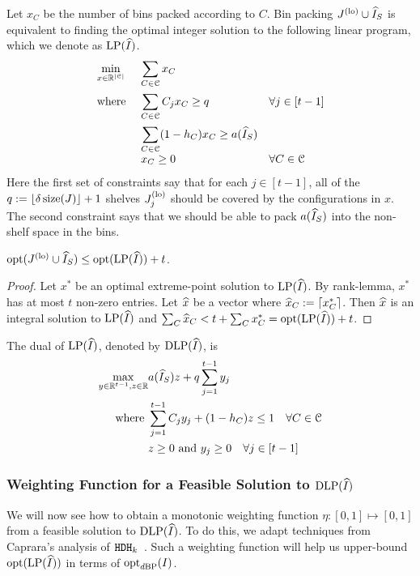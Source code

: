 Let $x_C$ be the number of bins packed according to \config{} $C$.
Bin packing $J^{\mathrm{(lo)}} \cup \widehat{I}_S$ is equivalent to finding the optimal integer solution
to the following linear program, which we denote as $\operatorname{LP}(\widehat{I})$.
\[ \begin{array}{*3{>{\displaystyle}l}}
\min_{x \in \mathbb{R}^{|\Ccal|}} & \sum_{C \in \Ccal} x_C
\\[1.5em] \textrm{where }
    & \sum_{C \in \Ccal} C_j x_C \ge q & \forall j \in [t-1]
\\[1.5em] & \sum_{C \in \Ccal} (1-h_C)x_C \ge a(\Ihat_S)
\\[1em] & x_C \ge 0 & \forall C \in \Ccal
\end{array} \]
Here the first set of constraints say that for each $j \in [t-1]$,
all of the $q := \left\lfloor \delta\operatorname{size}(J) \right\rfloor+1$ shelves $J^{\mathrm{(lo)}}_j$
should be covered by the configurations in $x$.
The second constraint says that we should be able to pack $a(\widehat{I}_S)$
into the non-shelf space in the bins.
\begin{lemma}
\label{thm:hgap:opt-to-lp}
$\operatorname{opt}(J^{\mathrm{(lo)}} \cup \widehat{I}_S) \le \operatorname{opt}(\operatorname{LP}(\widehat{I})) + t$.
\end{lemma}
\begin{proof}
Let $x^*$ be an optimal extreme-point solution to $\operatorname{LP}(\widehat{I})$.
By rank-lemma, $x^*$ has at most $t$ non-zero entries.
Let $\widehat{x}$ be a vector where $\widehat{x}_C := \left\lceil x_C^* \right\rceil$.
Then $\widehat{x}$ is an integral solution to $\operatorname{LP}(\widehat{I})$ and
$\sum_C \widehat{x}_C < t + \sum_C x_C^* = \operatorname{opt}(\operatorname{LP}(\widehat{I})) + t$.
\end{proof}
%
The dual of $\operatorname{LP}(\widehat{I})$, denoted by $\operatorname{DLP}(\widehat{I})$, is
\begin{align*}
\max_{y \in \mathbb{R}^{t-1}, z \in \mathbb{R}}
    & a(\widehat{I}_S)z + q \sum_{j=1}^{t-1} y_j
\\ \textrm{ where } & \sum_{j=1}^{t-1} C_j y_j + (1-h_C)z \le 1 \quad \forall C \in \mathcal{C}
\\ & z \ge 0 \textrm{ and } y_j \ge 0 \quad \forall j \in [t-1]
\end{align*}

\subsubsection{Weighting Function for a Feasible Solution to
\texorpdfstring{$\operatorname{DLP}(\widehat{I})$}{DLP(I\^{})}}

We will now see how to obtain a monotonic weighting function
$\eta: [0, 1] \mapsto [0, 1]$ from a feasible solution to $\operatorname{DLP}(\widehat{I})$.
To do this, we adapt techniques from Caprara's analysis of $\operatorname{\mathtt{HDH}}_{k}$~\cite{caprara2008}.
Such a weighting function will help us upper-bound $\operatorname{opt}(\operatorname{LP}(\widehat{I}))$
in terms of $\operatorname{opt}_{d\mathrm{BP}}(I)$.

